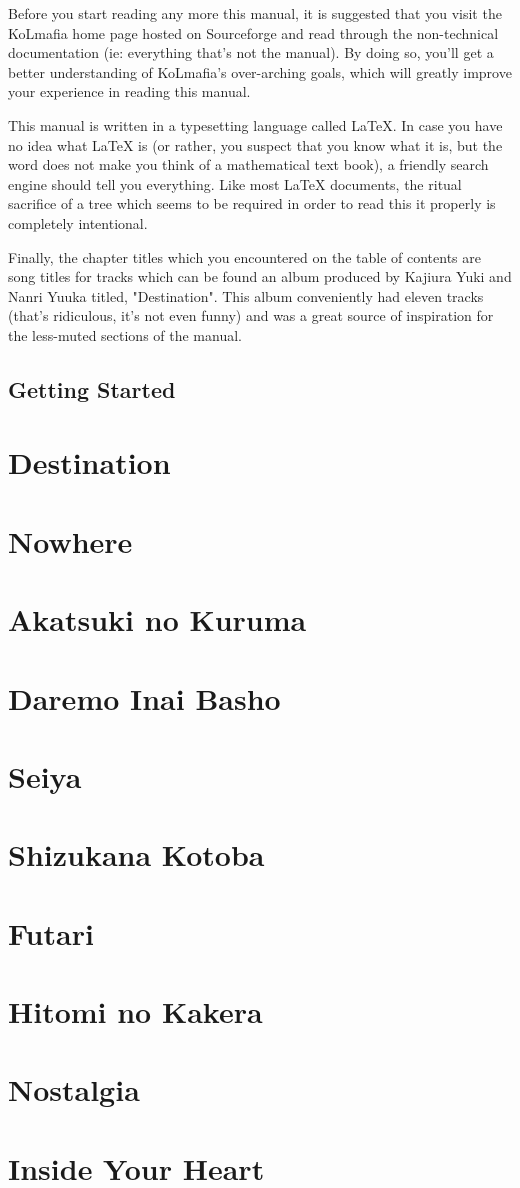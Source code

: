 \documentclass[twocolumn,letterpaper]{report}
\begin{document}
Before you start reading any more this manual, it is suggested that you visit the KoLmafia home page hosted on Sourceforge and read through the non-technical documentation (ie: everything that's not the manual). By doing so, you'll get a better understanding of KoLmafia's over-arching goals, which will greatly improve your experience in reading this manual.

This manual is written in a typesetting language called LaTeX.  In case you have no idea what LaTeX is (or rather, you suspect that you know what it is, but the word does not make you think of a mathematical text book), a friendly search engine should tell you everything.  Like most LaTeX documents, the ritual sacrifice of a tree which seems to be required in order to read this it properly is completely intentional.

Finally, the chapter titles which you encountered on the table of contents are song titles for tracks which can be found an album produced by Kajiura Yuki and Nanri Yuuka titled, "Destination".  This album conveniently had eleven tracks (that's ridiculous, it's not even funny) and was a great source of inspiration for the less-muted sections of the manual.

\section{Getting Started}

\chapter{Destination}
\chapter{Nowhere}
\chapter{Akatsuki no Kuruma}
\chapter{Daremo Inai Basho}
\chapter{Seiya}
\chapter{Shizukana Kotoba}
\chapter{Futari}
\chapter{Hitomi no Kakera}
\chapter{Nostalgia}
\chapter{Inside Your Heart}
\end{document}
